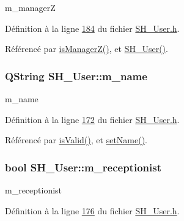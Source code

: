 m\-\_\-manager\-Z 



Définition à la ligne \hyperlink{SH__User_8h_source_l00184}{184} du fichier \hyperlink{SH__User_8h_source}{S\-H\-\_\-\-User.\-h}.



Référencé par \hyperlink{classSH__User_a763479597c54bb92ad2490826dedacfa}{is\-Manager\-Z()}, et \hyperlink{classSH__User_a96c0ebb3f11c1654935aaecb92295724}{S\-H\-\_\-\-User()}.

\hypertarget{classSH__User_abaf53f509224bdd7f8224259bffea2d6}{
\subsubsection[{m\-\_\-name}]{\setlength{\rightskip}{0pt plus 5cm}Q\-String S\-H\-\_\-\-User\-::m\-\_\-name\hspace{0.3cm}{\ttfamily [private]}}}\label{classSH__User_abaf53f509224bdd7f8224259bffea2d6}


m\-\_\-name 



Définition à la ligne \hyperlink{SH__User_8h_source_l00172}{172} du fichier \hyperlink{SH__User_8h_source}{S\-H\-\_\-\-User.\-h}.



Référencé par \hyperlink{classSH__User_a07de5c02b2a02b3bb2b0aaf0886bb4d9}{is\-Valid()}, et \hyperlink{classSH__User_af5037c555cb6fc44f2968ca2db35635f}{set\-Name()}.

\hypertarget{classSH__User_a86a5f8feb41c4238c5f022e9fbbe2e44}{
\subsubsection[{m\-\_\-receptionist}]{\setlength{\rightskip}{0pt plus 5cm}bool S\-H\-\_\-\-User\-::m\-\_\-receptionist\hspace{0.3cm}{\ttfamily [private]}}}\label{classSH__User_a86a5f8feb41c4238c5f022e9fbbe2e44}


m\-\_\-receptionist 



Définition à la ligne \hyperlink{SH__User_8h_source_l00176}{176} du fichier \hyperlink{SH__User_8h_source}{S\-H\-\_\-\-User.\-h}.



